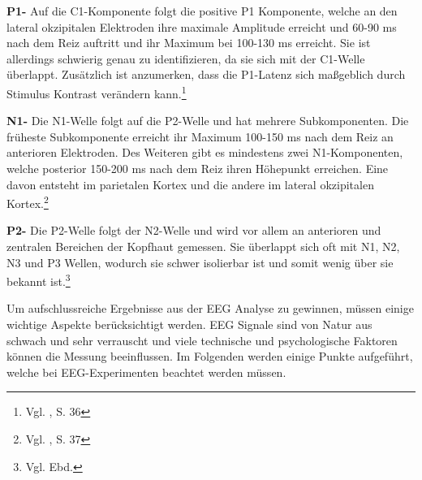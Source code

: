 \textbf{P1-} Auf die C1-Komponente folgt die positive P1 Komponente, welche an den lateral okzipitalen Elektroden ihre maximale Amplitude erreicht  und 60-90 ms nach dem Reiz auftritt und ihr Maximum bei 100-130 ms erreicht. Sie ist allerdings schwierig genau zu identifizieren, da sie sich mit der C1-Welle überlappt. Zusätzlich ist anzumerken, dass die P1-Latenz sich maßgeblich durch Stimulus Kontrast verändern kann.\footnote{Vgl. \cite{luck2005}, S. 36}

\textbf{N1-} Die N1-Welle folgt auf die P2-Welle und hat mehrere Subkomponenten. Die früheste Subkomponente erreicht ihr Maximum 100-150 ms nach dem Reiz an anterioren Elektroden. Des Weiteren gibt es mindestens zwei N1-Komponenten, welche posterior 150-200 ms nach dem Reiz ihren Höhepunkt erreichen. Eine davon entsteht im parietalen Kortex und die andere im lateral okzipitalen Kortex.\footnote{Vgl. \cite{luck2005}, S. 37} 

\textbf{P2-} Die P2-Welle folgt der N2-Welle und wird vor allem an anterioren und zentralen Bereichen der Kopfhaut gemessen. Sie überlappt sich oft mit N1, N2, N3 und P3 Wellen, wodurch sie schwer isolierbar ist und somit wenig über sie bekannt ist.\footnote{Vgl. Ebd.}

Um aufschlussreiche Ergebnisse aus der EEG Analyse zu gewinnen, müssen einige wichtige Aspekte berücksichtigt werden. EEG Signale sind von Natur aus schwach und sehr verrauscht und viele technische und psychologische Faktoren können die Messung beeinflussen. Im Folgenden werden einige Punkte aufgeführt, welche bei EEG-Experimenten beachtet werden müssen. 

